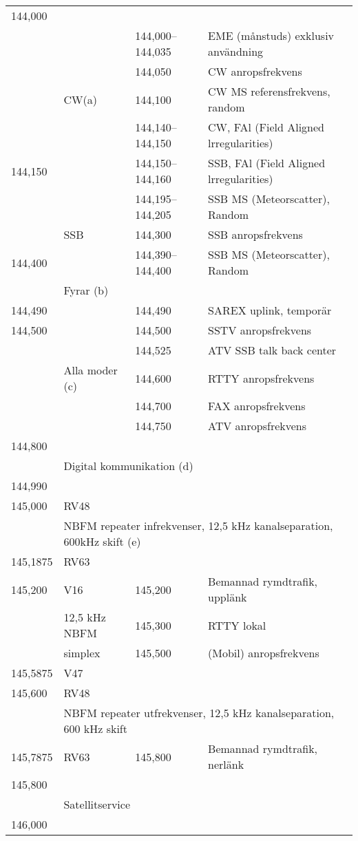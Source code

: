 \begin{longtable}{llll}
144,000 & & & \\
        &       & 144,000--144,035 & EME (månstuds) exklusiv användning \\
        &       & 144,050           & CW anropsfrekvens \\
        & CW(a) & 144,100           & CW MS referensfrekvens, random \\
        &       & 144,140--144,150 & CW, FAl (Field Aligned lrregularities) \\
144,150 &       & 144,150--144,160 & SSB, FAl (Field Aligned lrregularities) \\
        &       & 144,195--144,205 & SSB MS (Meteorscatter), Random \\
        & SSB   & 144,300           & SSB anropsfrekvens \\
144,400 &       & 144,390--144,400 & SSB MS (Meteorscatter), Random \\
        & Fyrar (b) & & \\
144,490 &       & 144,490 & SAREX uplink, temporär \\
144,500 &       & 144,500 & SSTV anropsfrekvens \\
        &       & 144,525 & ATV SSB talk back center \\
        & Alla moder (c) & 144,600 & RTTY anropsfrekvens \\
        &       & 144,700 & FAX anropsfrekvens \\
        &       & 144,750 & ATV anropsfrekvens \\
144,800 & & & \\
        & \multicolumn{3}{l}{Digital kommunikation (d)} \\
144,990 & & & \\
145,000 & RV48 & & \\
        & \multicolumn{3}{l}{NBFM repeater infrekvenser, 12,5 kHz kanalseparation, 600kHz skift (e)} \\
145,1875 & RV63 & & \\
145,200 & V16   & 145,200 & Bemannad rymdtrafik, upplänk \\
        & 12,5 kHz NBFM & 145,300 & RTTY lokal \\
        & simplex & 145,500 & (Mobil) anropsfrekvens \\
145,5875 & V47 & & \\
145,600 & RV48 & & \\
        & \multicolumn{3}{l}{NBFM repeater utfrekvenser, 12,5 kHz kanalseparation, 600 kHz skift} \\
145,7875 & RV63 & 145,800 & Bemannad rymdtrafik, nerlänk \\
145,800 & & & \\
        & \multicolumn{3}{l}{Satellitservice} \\
146,000 & & & \\
\end{longtable}


